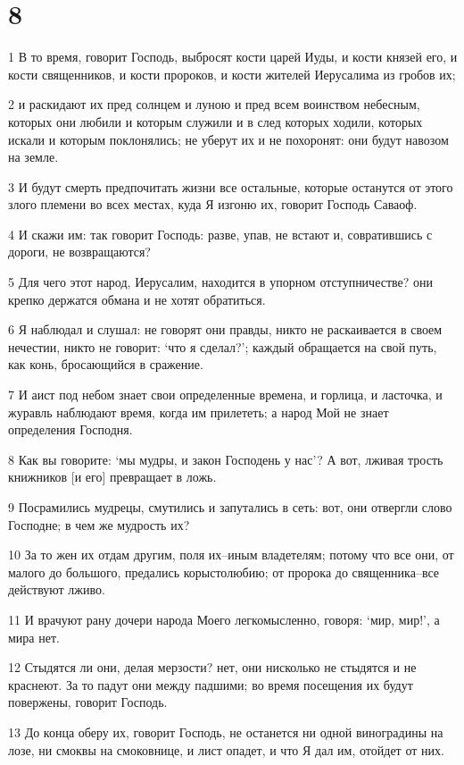 \chapter{8}

\par 1 В то время, говорит Господь, выбросят кости царей Иуды, и кости князей его, и кости священников, и кости пророков, и кости жителей Иерусалима из гробов их;
\par 2 и раскидают их пред солнцем и луною и пред всем воинством небесным, которых они любили и которым служили и в след которых ходили, которых искали и которым поклонялись; не уберут их и не похоронят: они будут навозом на земле.
\par 3 И будут смерть предпочитать жизни все остальные, которые останутся от этого злого племени во всех местах, куда Я изгоню их, говорит Господь Саваоф.
\par 4 И скажи им: так говорит Господь: разве, упав, не встают и, совратившись с дороги, не возвращаются?
\par 5 Для чего этот народ, Иерусалим, находится в упорном отступничестве? они крепко держатся обмана и не хотят обратиться.
\par 6 Я наблюдал и слушал: не говорят они правды, никто не раскаивается в своем нечестии, никто не говорит: `что я сделал?'; каждый обращается на свой путь, как конь, бросающийся в сражение.
\par 7 И аист под небом знает свои определенные времена, и горлица, и ласточка, и журавль наблюдают время, когда им прилететь; а народ Мой не знает определения Господня.
\par 8 Как вы говорите: `мы мудры, и закон Господень у нас'? А вот, лживая трость книжников [и его] превращает в ложь.
\par 9 Посрамились мудрецы, смутились и запутались в сеть: вот, они отвергли слово Господне; в чем же мудрость их?
\par 10 За то жен их отдам другим, поля их--иным владетелям; потому что все они, от малого до большого, предались корыстолюбию; от пророка до священника--все действуют лживо.
\par 11 И врачуют рану дочери народа Моего легкомысленно, говоря: `мир, мир!', а мира нет.
\par 12 Стыдятся ли они, делая мерзости? нет, они нисколько не стыдятся и не краснеют. За то падут они между падшими; во время посещения их будут повержены, говорит Господь.
\par 13 До конца оберу их, говорит Господь, не останется ни одной виноградины на лозе, ни смоквы на смоковнице, и лист опадет, и что Я дал им, отойдет от них.
